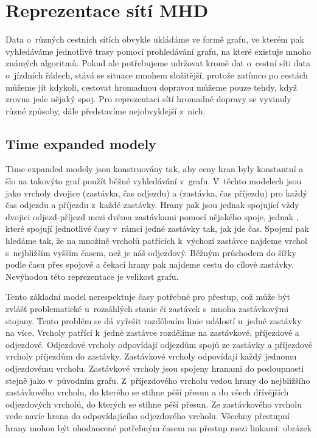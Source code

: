 \chapter{Reprezentace sítí MHD}
Data o~různých cestních sítích obvykle ukládáme ve formě grafu, ve kterém pak
vyhledáváme jednotlivé trasy pomocí prohledávání grafu, na které existuje mnoho
známých algoritmů. Pokud ale potřebujeme udržovat kromě dat o~cestní síti data
o~jízdních řádech, stává se situace mnohem složitější, protože zatímco po cestách
můžeme jít kdykoli, cestovat hromadnou dopravou můžeme pouze tehdy, když zrovna
jede nějaký spoj. Pro reprezentaci sítí hromadné dopravy se vyvinuly různé
způsoby, dále představíme nejobvyklejší z~nich.

\section{Time expanded modely}
Time-expanded modely \cite{time-expanded} jsou konstruovány tak, aby ceny hran
byly konstantní a šlo na takovýto graf použít běžné vyhledávání v~grafu.
V~těchto modelech jsou jako vrcholy dvojice (zastávka, čas odjezdu) a (zastávka,
čas příjezdu) pro každý čas odjezdu a příjezdu z~každé zastávky. Hrany pak
jsou jednak  spojující vždy dvojici odjezd-příjezd mezi dvěma
zastávkami pomocí nějakého spoje, jednak , které spojují jednotlivé
časy v~rámci jedné zastávky tak, jak jde čas. Spojení pak hledáme tak, že na
množině vrcholů patřících k~výchozí zastávce najdeme vrchol s~nejbližším vyšším
časem, než je náš odjezdový. Běžným průchodem do šířky podle času přes spojové a
čekací hrany pak najdeme cestu do cílové zastávky. Nevýhodou této reprezentace
je velikost grafu.

Tento základní model nerespektuje časy potřebné pro přestup, což může být
zvlášť problematické u~rozsáhlých stanic či zastávek s~mnoha zastávkovými
stojany. Tento problém se dá vyřešit rozdělením linie událostí u~jedné zastávky
na více. Vrcholy patřící k~jedné zastávce rozdělíme na zastávkové, příjezdové a
odjezdové. Odjezdové vrcholy odpovídají odjezdům spojů ze zastávky a příjezdové
vrcholy příjezdům do zastávky. Zastávkové vrcholy odpovídají každý jednomu
odjezdovému vrcholu. Zastávkové vrcholy jsou spojeny hranami do posloupnosti
stejně jako v~původním grafu. Z~příjezdového vrcholu vedou hrany do nejbližšího
zastávkového vrcholu, do kterého se stihne pěší přesun a do všech dřívějších
odjezdových vrcholů, do kterých se stihne pěší přesun. Ze zastávkového vrcholu
vede navíc hrana do odpovídajícího odjezdového vrcholu. Všechny přestupní hrany
mohou být ohodnocené potřebným časem na přestup mezi linkami. 
\TODO obrázek


